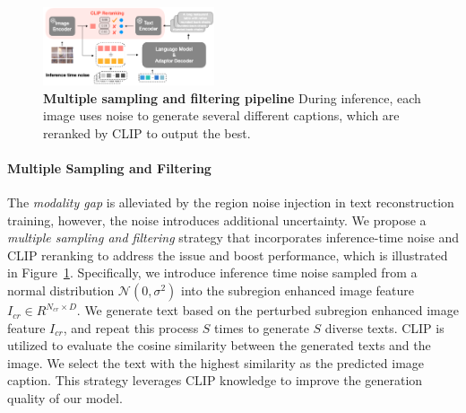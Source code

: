 

\begin{figure}[t!]
  \centering
  \includegraphics[width=0.45\textwidth]{AnonymousSubmission/LaTeX/asserts/rerank.png}
   \caption{\textbf{Multiple sampling and filtering pipeline} During inference, each image uses noise to generate several different captions, which are reranked by CLIP to output the best.}
    \label{figure:rerank}
\end{figure}


\paragraph{\textbf{Multiple Sampling and Filtering}} 
The \textit{modality gap} is alleviated by the region noise injection in text reconstruction training, however, the noise introduces additional uncertainty. We propose a \textit{multiple sampling and filtering} strategy that incorporates inference-time noise and CLIP reranking to address the issue and boost performance, which is illustrated in Figure~\ref{figure:rerank}. Specifically, we introduce inference time noise sampled from a normal distribution $\mathcal{N}(0,\sigma^{2})$ into the subregion enhanced image feature $I_{cr} \in R^{N_{cr} \times D}$. We generate text based on the perturbed subregion enhanced image feature $I_{cr}$, and repeat this process $S$ times to generate $S$ diverse texts. CLIP is utilized to evaluate the cosine similarity between the generated texts and the image. We select the text with the highest similarity as the predicted image caption. This strategy leverages CLIP knowledge to improve the generation quality of our model.

